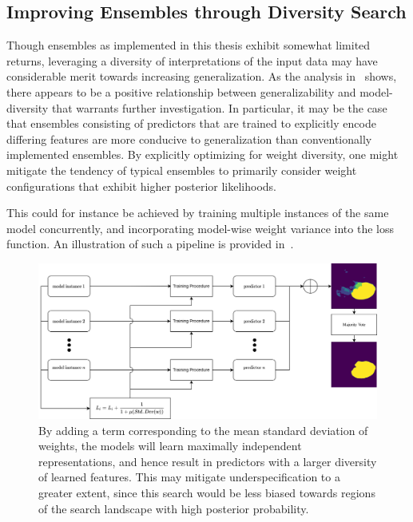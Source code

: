     \subsection{Improving Ensembles through Diversity Search}
    Though ensembles as implemented in this thesis exhibit somewhat limited returns, leveraging a diversity of interpretations of the input data may have considerable merit towards increasing generalization. As the analysis in~ shows, there appears to be a positive relationship between generalizability and model-diversity that warrants further investigation. In particular, it may be the case that ensembles consisting of predictors that are trained to explicitly encode differing features are more conducive to generalization than conventionally implemented ensembles. By explicitly optimizing for weight diversity, one might mitigate the tendency of typical ensembles to primarily consider weight configurations that exhibit higher posterior likelihoods. 
    
    This could for instance be achieved by training multiple instances of the same model concurrently, and incorporating model-wise weight variance into the loss function. An illustration of such a pipeline is provided in~.
    
    \begin{figure}[htb]
        \centering
        \includegraphics[width=\linewidth]{illustrations/diversity_search.png}
        \caption[Deep Diversity Search]{By adding a term corresponding to the mean standard deviation of weights, the models will learn maximally independent representations, and hence result in predictors with a larger diversity of learned features. This may mitigate underspecification to a greater extent, since this search would be less biased towards regions of the search landscape with high posterior probability.}
        \label{fig:diversity}
    \end{figure}
    
